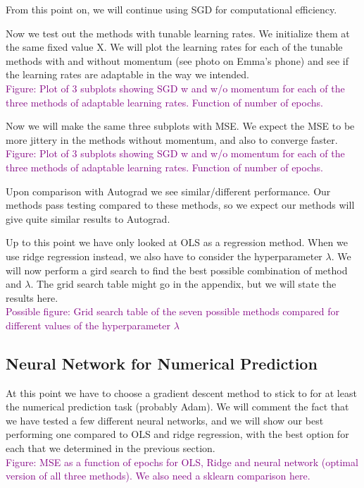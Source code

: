 From this point on, we will continue using SGD for computational efficiency.

Now we test out the methods with tunable learning rates. We initialize them at the same fixed value X. We will plot the learning rates for each of the tunable methods with and without momentum (see photo on Emma's phone) and see if the learning rates are adaptable in the way we intended.\\
\textcolor{purple}{Figure: Plot of 3 subplots showing SGD w and w/o momentum for each of the three methods of adaptable learning rates.  Function of number of epochs.}


Now we will make the same three subplots with MSE. We expect the MSE to be more jittery in the methods without momentum, and also to converge faster.\\
\textcolor{purple}{Figure: Plot of 3 subplots showing SGD w and w/o momentum for each of the three methods of adaptable learning rates.  Function of number of epochs.}

Upon comparison with Autograd we see similar/different performance. Our methods pass testing compared to these methods, so we expect our methods will give quite similar results to Autograd.

Up to this point we have only looked at OLS as a regression method. When we use ridge regression instead, we also have to consider the hyperparameter $\lambda$. We will now perform a gird search to find the best possible combination of method and $\lambda$. The grid search table might go in the appendix, but we will state the results here.\\
\textcolor{purple}{Possible figure: Grid search table of the seven possible methods compared for different values of the hyperparameter $\lambda$}

\subsection{Neural Network for Numerical Prediction}
At this point we have to choose a gradient descent method to stick to for at least the numerical prediction task (probably Adam). We will comment the fact that we have tested a few different neural networks, and we will show our best performing one compared to OLS and ridge regression, with the best option for each that we determined in the previous section.\\
\textcolor{purple}{Figure: MSE as a function of epochs for OLS, Ridge and neural network (optimal version of all three methods). We also need a sklearn comparison here.}

